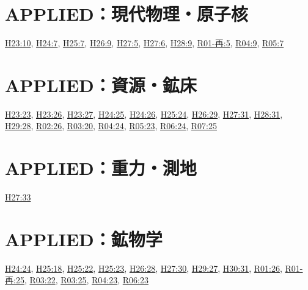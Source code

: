 \section{APPLIED：現代物理・原子核}
\hyperref[q:h23-reg-applied-10]{H23:10}, \hyperref[q:h24-reg-applied-07]{H24:7}, \hyperref[q:h25-reg-applied-07]{H25:7}, \hyperref[q:h26-reg-applied-09]{H26:9}, \hyperref[q:h27-reg-applied-05]{H27:5}, \hyperref[q:h27-reg-applied-06]{H27:6}, \hyperref[q:h28-reg-applied-09]{H28:9}, \hyperref[q:r01-ret-applied-05]{R01-再:5}, \hyperref[q:r04-reg-applied-09]{R04:9}, \hyperref[q:r05-reg-applied-07]{R05:7}
\section{APPLIED：資源・鉱床}
\hyperref[q:h23-reg-applied-23]{H23:23}, \hyperref[q:h23-reg-applied-26]{H23:26}, \hyperref[q:h23-reg-applied-27]{H23:27}, \hyperref[q:h24-reg-applied-25]{H24:25}, \hyperref[q:h24-reg-applied-26]{H24:26}, \hyperref[q:h25-reg-applied-24]{H25:24}, \hyperref[q:h26-reg-applied-29]{H26:29}, \hyperref[q:h27-reg-applied-31]{H27:31}, \hyperref[q:h28-reg-applied-31]{H28:31}, \hyperref[q:h29-reg-applied-28]{H29:28}, \hyperref[q:r02-reg-applied-26]{R02:26}, \hyperref[q:r03-reg-applied-20]{R03:20}, \hyperref[q:r04-reg-applied-24]{R04:24}, \hyperref[q:r05-reg-applied-23]{R05:23}, \hyperref[q:r06-reg-applied-24]{R06:24}, \hyperref[q:r07-reg-applied-25]{R07:25}
\section{APPLIED：重力・測地}
\hyperref[q:h27-reg-applied-33]{H27:33}
\section{APPLIED：鉱物学}
\hyperref[q:h24-reg-applied-24]{H24:24}, \hyperref[q:h25-reg-applied-18]{H25:18}, \hyperref[q:h25-reg-applied-22]{H25:22}, \hyperref[q:h25-reg-applied-23]{H25:23}, \hyperref[q:h26-reg-applied-28]{H26:28}, \hyperref[q:h27-reg-applied-30]{H27:30}, \hyperref[q:h29-reg-applied-27]{H29:27}, \hyperref[q:h30-reg-applied-31]{H30:31}, \hyperref[q:r01-reg-applied-26]{R01:26}, \hyperref[q:r01-ret-applied-25]{R01-再:25}, \hyperref[q:r03-reg-applied-22]{R03:22}, \hyperref[q:r03-reg-applied-25]{R03:25}, \hyperref[q:r04-reg-applied-23]{R04:23}, \hyperref[q:r06-reg-applied-23]{R06:23}
